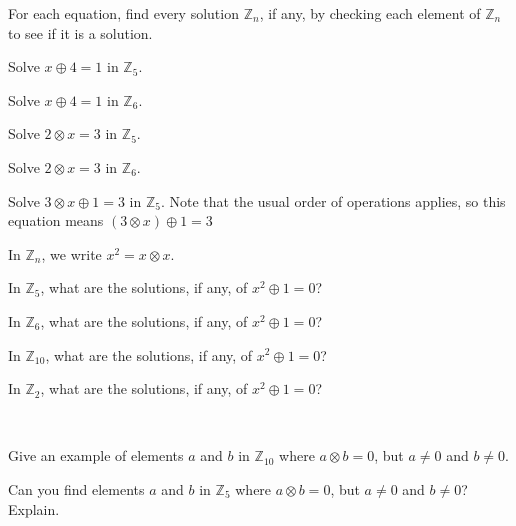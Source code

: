 \begin{exer}[\exerU] %
\label{exer_solve_linear_modn}
    For each equation, find every solution $\mathbb{Z}_n$, if any, by checking each element of $\mathbb{Z}_n$ to see if it is a solution.
        \begin{exerpart}
            \item Solve $x \oplus 4 = 1$ in $\mathbb{Z}_5$.  
            \item Solve $x \oplus 4 = 1$ in $\mathbb{Z}_6$.
            \item Solve $2 \otimes x = 3$ in $\mathbb{Z}_5$.
            \item Solve $2 \otimes x = 3$ in $\mathbb{Z}_6$.
            \item Solve $3 \otimes x \oplus 1 = 3$ in $\mathbb{Z}_5$.  Note that the usual order of operations applies, so this equation means $(3 \otimes x) \oplus 1 = 3$
        \end{exerpart}
\end{exer}

\begin{exer}[\exerU] %
\label{exer_modn_sqrtminus1_examples}
    In $\mathbb{Z}_n$, we write $x^2=x \otimes x$.
    \begin{exerpart}
        \item  In $\mathbb{Z}_5$, what are the solutions, if any, of $x^2\oplus 1 = 0$?  
        \item  In $\mathbb{Z}_6$, what are the solutions, if any, of $x^2\oplus 1 = 0$? 
        \item  In $\mathbb{Z}_{10}$, what are the solutions, if any, of $x^2\oplus 1 = 0$? 
        \item In $\mathbb{Z}_2$, what are the solutions, if any, of $x^2\oplus 1 = 0$? 
    \end{exerpart}
\end{exer}

\begin{exer}[\exerU] %
\label{exer_zero_divisors_examples}
~
    \begin{exerpart}
        \item Give an example of elements $a$ and $b$ in $\mathbb{Z}_{10}$ where $a \otimes b = 0$, but $a \neq 0$ and $b \neq 0$.
        \item Can you find elements $a$ and $b$ in $\mathbb{Z}_5$ where $a \otimes b = 0$, but $a \neq 0$ and $b \neq 0$?  Explain.  
    \end{exerpart}
\end{exer}

